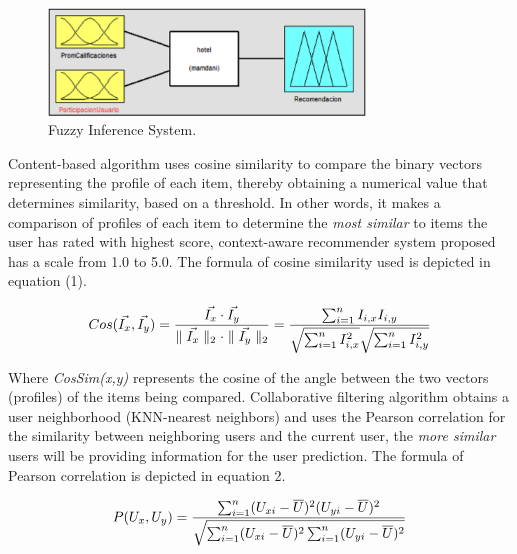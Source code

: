 \begin{figure}
\captionsetup{justification=centering,margin=2cm}
\centering

\setlength\fboxsep{0pt}
\setlength\fboxrule{0.7pt}
\includegraphics[width=0.75\textwidth]{img/fis.png}
\caption{Fuzzy Inference System.}
\label{fig:fis}       %
\end{figure}

Content-based algorithm uses cosine similarity to compare the binary vectors
representing the profile of each item, thereby obtaining a numerical value that
determines similarity, based on a threshold. In other words, it makes a
comparison of profiles of each item to determine the \textit{most similar} to
items the user has rated with highest score, context-aware recommender system
proposed has a scale from 1.0 to 5.0. The formula of cosine similarity used is
depicted in equation (1).

\begin{equation}
\displaystyle %
 Cos (\vec{I_{x}}, \vec{I_{y}}) ={\vec{I_{x}} \cdot  \vec{I_{y}} \over \parallel \vec{I_{x}} \parallel_{2} \cdot \parallel \vec{I_{y}} \parallel_{2}} = {\sum_{i=1}^{n} I_{i,x} I_{i,y} \over \sqrt{\sum_{i=1}^{n} I_{i,x}^{2}} \sqrt{\sum_{i=1}^{n} I_{i,y}^{2}}} 
\end{equation}

Where \textit{CosSim(x,y)} represents the cosine of the angle between the two vectors
(profiles) of the items being compared. Collaborative filtering algorithm
obtains a user neighborhood (KNN-nearest neighbors) and uses the Pearson
correlation for the similarity between neighboring users and the current user,
the \textit{more similar} users will be providing information for the user prediction.
The formula of Pearson correlation \cite{ricci2011introduction} is depicted in equation 2.

\begin{equation}
\displaystyle
P(U_{x}, U_{y}) = {\sum_{i=1}^{n}(U_{xi} - \overline{U})^2 (U_{yi}- \overline{U})^2 \over \sqrt{\sum_{i=1}^{n}(U_{xi}- \overline{U})^2 \sum_{i=1}^{n}(U_{yi}- \overline{U})^2}}
\end{equation}
\\

